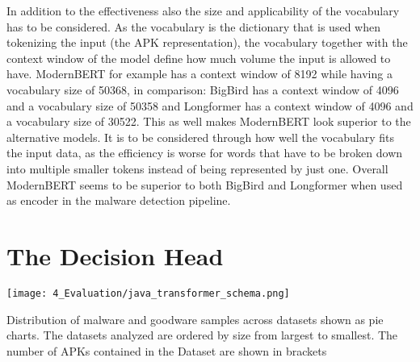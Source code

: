 \begin{table}[b] 
    \caption{\label{tab:encoder_model_comparison_cls}%
    Performance comparison of different encoder models for generating embeddings. The APK representation is fixed to Activities (A) and Permissions (P). The encoder was trained through backpropagation in this experiment. The transcenden subset was used as dataset. The embedding of the CLS token was used as APK embedding.}    
\end{table}

In addition to the effectiveness also the size and applicability of 
the vocabulary has to be considered. As the vocabulary is the dictionary that
is used when tokenizing the input (the APK representation), the vocabulary 
together with the context window of the model define how much volume the
input is allowed to have. ModernBERT for example has a context window of
8192 while having a vocabulary size of 50368, in comparison: BigBird has 
a context window of 4096 and a vocabulary size of 50358 and Longformer has
a context window of 4096 and a vocabulary size of 30522. This as well makes 
ModernBERT look superior to the alternative models. It is to be considered through
how well the vocabulary fits the input data, as the efficiency is worse for 
words that have to be broken down into multiple smaller tokens instead of being
represented by just one.
Overall ModernBERT seems to be superior to both BigBird and Longformer when used as encoder in 
the malware detection pipeline.


\section{The Decision Head}

\begin{marginfigure}[3\baselineskip] %
    \center
    \texttt{[image: 4\_Evaluation/java\_transformer\_schema.png]}
    \caption{\label{fig:java_transformer_schema}
    Distribution of malware and goodware samples across datasets shown as pie charts.
    The datasets analyzed are ordered by size from largest to smallest.
    The number of APKs contained in the Dataset are shown in brackets}
\end{marginfigure}


